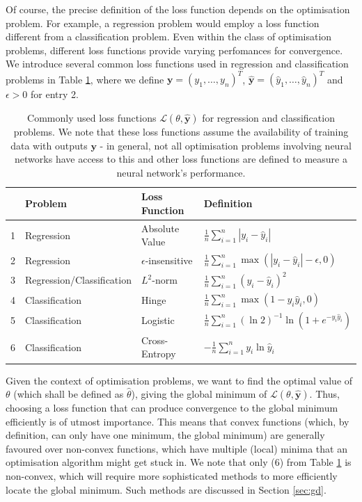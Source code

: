 \documentclass[a4paper,11pt,titlepage]{article}
\theoremstyle{definition}
\theoremstyle{plain}
\theoremstyle{remark}
\begin{document}
Of course, the precise definition of the loss function depends on the optimisation problem. For example, a regression problem would employ a loss function different from a classification problem. Even within the class of optimisation problems, different loss functions provide varying perfomances for convergence. We introduce several common loss functions used in regression and classification problems in Table \ref{tab:lfd}, where we define $\mathbf{y} = \left(y_1, \dots, y_n\right)^T$, $\mathbf{\hat{y}} = \left(\hat{y}_1, \dots, \hat{y}_n\right)^T$ and $\epsilon > 0$ for entry 2.
\begin{table}[htbp]
    \centering
    \begin{tabular}{llll}
        \toprule
          & Problem  & Loss Function  &  Definition \\
        \midrule
        1 & Regression       & Absolute Value            & $\frac{1}{n}\sum_{i=1}^n |y_i - \hat{y}_i|$      \\
        2 &Regression       & $\epsilon$-insensitive   & $\frac{1}{n}\sum_{i=1}^n \max{(|y_i - \hat{y}_i| - \epsilon, 0)}$\\
        3 & Regression/Classification       & $L^2$-norm                   & $\frac{1}{n}\sum_{i=1}^n\left(y_i - \hat{y}_i\right)^2$        \\
        4 & Classification  & Hinge                     & $\frac{1}{n}\sum_{i=1}^n\max{(1-y_i\hat{y}_i, 0)}$ \\
        5 & Classification  & Logistic                  & $\frac{1}{n}\sum_{i=1}^n \left(\ln 2\right)^{-1}\ln(1 + e^{-y_i\hat{y}_i})$ \\
        6 & Classification  & Cross-Entropy             & $-\frac{1}{n} \sum_{i=1}^n y_i\ln \hat{y}_i$\\ 
        \bottomrule
    \end{tabular}
    \caption{Commonly used loss functions $\mathcal{L}(\theta, \mathbf{\hat{y}})$ for regression and classification problems. We note that these loss functions assume the availability of training data with outputs $\mathbf{y}$ - in general, not all optimisation problems involving neural networks have access to this and other loss functions are defined to measure a neural network's performance.}
    \label{tab:lfd}
\end{table}

Given the context of optimisation problems, we want to find the optimal value of $\theta$ (which shall be defined as $\hat{\theta}$), giving the global minimum of $\mathcal{L}(\theta, \mathbf{\hat{y}})$. Thus, choosing a loss function that can produce convergence to the global minimum efficiently is of utmost importance. This means that convex functions (which, by definition, can only have one minimum, the global minimum) are generally favoured over non-convex functions, which have multiple (local) minima that an optimisation algorithm might get stuck in. We note that only (6) from Table \ref{tab:lfd} is non-convex, which will require more sophisticated methods to more efficiently locate the global minimum. Such methods are discussed in Section \ref{sec:gd}.
\end{document}

